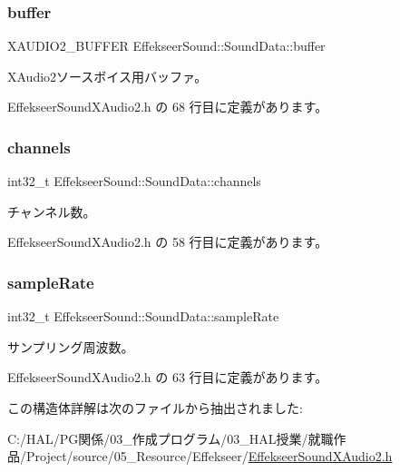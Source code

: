 \subsubsection{\texorpdfstring{buffer}{buffer}}
{\footnotesize\ttfamily X\+A\+U\+D\+I\+O2\+\_\+\+B\+U\+F\+F\+ER Effekseer\+Sound\+::\+Sound\+Data\+::buffer}



X\+Audio2ソースボイス用バッファ。 



 Effekseer\+Sound\+X\+Audio2.\+h の 68 行目に定義があります。

\mbox{\label{struct_effekseer_sound_1_1_sound_data_a6ce06a2fb5016cc2664b525ace949423}} 
\subsubsection{\texorpdfstring{channels}{channels}}
{\footnotesize\ttfamily int32\+\_\+t Effekseer\+Sound\+::\+Sound\+Data\+::channels}



チャンネル数。 



 Effekseer\+Sound\+X\+Audio2.\+h の 58 行目に定義があります。

\mbox{\label{struct_effekseer_sound_1_1_sound_data_a32d83df2626bbfbeafa1f6ebe72d9516}} 
\subsubsection{\texorpdfstring{sample\+Rate}{sampleRate}}
{\footnotesize\ttfamily int32\+\_\+t Effekseer\+Sound\+::\+Sound\+Data\+::sample\+Rate}



サンプリング周波数。 



 Effekseer\+Sound\+X\+Audio2.\+h の 63 行目に定義があります。



この構造体詳解は次のファイルから抽出されました\+:\begin{DoxyCompactItemize}
\item 
C\+:/\+H\+A\+L/\+P\+G関係/03\+\_\+作成プログラム/03\+\_\+\+H\+A\+L授業/就職作品/\+Project/source/05\+\_\+\+Resource/\+Effekseer/\mbox{\hyperlink{_effekseer_sound_x_audio2_8h}{Effekseer\+Sound\+X\+Audio2.\+h}}\end{DoxyCompactItemize}
